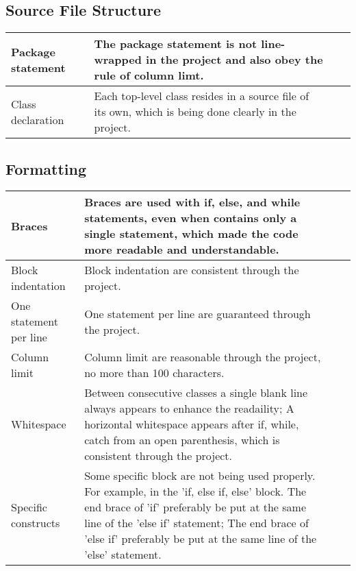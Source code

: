 \documentclass[a4paper, 11pt]{article}
\begin{document}
\subsection{Source File Structure}
\indent
\begin{center}
\renewcommand\arraystretch{2.0}
\begin{tabularx}{\textwidth}{|%
   >{\hsize=1.0\hsize}X|
   >{\hsize=2.0\hsize}X|
   >{\hsize=0.5\hsize}X|
   >{\hsize=0.5\hsize}X|}
\hline
Package statement & The package statement is not line-wrapped in the project and also obey the rule of column limt. \\

\hline
Class declaration & Each top-level class resides in a source file of its own, which is being done clearly in the project. \\


\hline
\end{tabularx}
\end{center}
\indent

\subsection{Formatting}

\indent
\begin{center}
\renewcommand\arraystretch{2.0}
\begin{tabularx}{\textwidth}{|%
   >{\hsize=1.0\hsize}X|
   >{\hsize=2.0\hsize}X|
   >{\hsize=0.5\hsize}X|
   >{\hsize=0.5\hsize}X|}
\hline
Braces & Braces are used with if, else, and while statements, even when contains only a single statement, which made the code more readable and understandable. \\

\hline
Block indentation & Block indentation are consistent through the project.\\

\hline
One statement per line & One statement per line are guaranteed through the project.\\

\hline
Column limit & Column limit are reasonable through the project, no more than 100 characters.\\


\hline
Whitespace & Between consecutive classes a single blank line always appears to enhance the readaility;
A horizontal whitespace appears after if, while, catch from an open parenthesis, which is consistent through the project.
\\

\hline
Specific constructs & Some specific block are not being used properly. For example, in the 'if, else if, else' block. The end brace of 'if' preferably be put at the same line of the 'else if' statement; The end brace of 'else if' preferably be put at the same line of the 'else' statement.\\

\hline
\end{tabularx}
\end{center}
\indent
\end{document}
